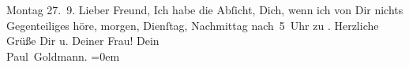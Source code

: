 \begin{ledgroupsized}[t]{13cm}
           \pstart
           {\pb}Montag 27. 9.\pend
           \pstart
           Lieber Freund, Ich habe die Abſicht, Dich, wenn ich von
               Dir nichts Gegenteiliges höre, morgen, Dienſtag, Nachmittag nach 5 Uhr zu \label{K_L03252-2v}\label{K_L03252-2h}. Herzliche Grüße Dir u. Deiner Frau!\pend
           \pstart
           Dein {\\[\baselineskip]}\spacefill\mbox{Paul Goldmann.}\pend
           \leftskip=0em{}
         
         \endnumbering{}\end{ledgroupsized}  \newcommand{\dateiname}{L03252}\newcommand{\titel}{Paul Goldmann an Arthur Schnitzler, 27. 9. 1909}\newcommand{\editorInnen}{Martin Anton Müller und Laura Untner}
      